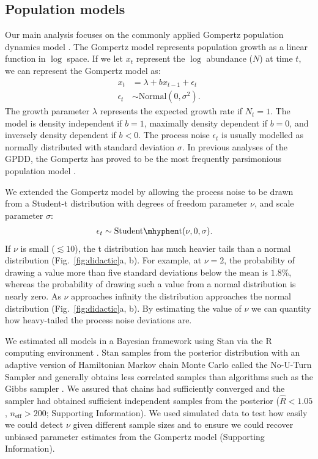 \subsection{Population models}

Our main analysis focuses on the commonly applied Gompertz population dynamics
model \citep[e.g.][]{knape2012,dennis2014,connors2014}. The Gompertz model
represents population growth as a linear function in $\log$ space. If we let
$x_t$ represent the $\log$ abundance ($N$) at time $t$, we can represent the
Gompertz model as:
\begin{align*}
x_t &= \lambda + b x_{t-1} + \epsilon_t\\
\epsilon_t &\sim \mathrm{Normal}(0, \sigma^2).
\end{align*}
The growth parameter $\lambda$ represents the expected growth rate if $N_t
= 1$. The model is density independent if $b = 1$, maximally density dependent
if $b = 0$, and inversely density dependent if $b < 0$. The process noise
$\epsilon_t$ is usually modelled as normally distributed with standard
deviation $\sigma$. In previous analyses of the GPDD, the Gompertz has proved
to be the most frequently parsimonious population model \citep{brook2006}.

We extended the Gompertz model by allowing the process noise to be
drawn from a Student-t distribution with degrees of freedom parameter $\nu$,
and scale parameter $\sigma$:
\begin{align*}
\epsilon_t &\sim \mathrm{Student\mhyphen t}(\nu, 0, \sigma).
\end{align*}
If $\nu$ is small ($\lesssim 10$), the t distribution has much heavier tails
than a normal distribution (Fig.~\ref{fig:didactic}a, b). For example, at $\nu
= 2$, the probability of drawing a value more than five standard deviations
below the mean is $1.8$\%, whereas the probability of drawing such a value from
a normal distribution is nearly zero. As $\nu$ approaches infinity the
distribution approaches the normal distribution (Fig.~\ref{fig:didactic}a, b).
By estimating the value of $\nu$ we can quantity how heavy-tailed the process
noise deviations are.


We estimated all models in a Bayesian framework using Stan \citep[][version
2.4.0]{stan-manual2014} via the R computing environment \citep{r2014}. Stan
samples from the posterior distribution with an adaptive version of Hamiltonian
Markov chain Monte Carlo called the No-U-Turn Sampler and generally obtains
less correlated samples than algorithms such as the Gibbs sampler
\citep{hoffman2014}. We assured that chains had sufficiently converged and the
sampler had obtained sufficient independent samples from the posterior
($\widehat{R} < 1.05$, $n_\mathrm{eff} > 200$; Supporting Information). We used
simulated data to test how easily we could detect $\nu$ given different sample
sizes and to ensure we could recover unbiased parameter estimates from the
Gompertz model (Supporting Information).

